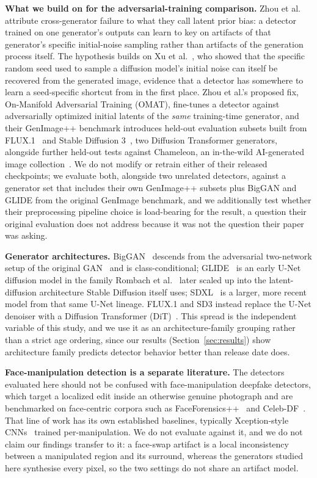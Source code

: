\documentclass[3p,times,procedia]{elsarticle}
\begin{document}
\textbf{What we build on for the adversarial-training comparison.} Zhou et
al.~\cite{zhou2025omat} attribute cross-generator failure to what they
call latent prior bias: a detector trained on one generator's outputs can
learn to key on artifacts of that generator's specific initial-noise
sampling rather than artifacts of the generation process itself. The
hypothesis builds on Xu et al.~\cite{xu2025seeds}, who showed that the
specific random seed used to sample a diffusion model's initial noise can
itself be recovered from the generated image, evidence that a detector has
somewhere to learn a seed-specific shortcut from in the first place. Zhou
et al.'s proposed fix, On-Manifold Adversarial Training (OMAT), fine-tunes
a detector against adversarially optimized initial latents of the
\emph{same} training-time generator, and their GenImage++ benchmark
introduces held-out evaluation subsets built from FLUX.1~\cite{flux2024}
and Stable Diffusion 3~\cite{esser2024sd3}, two Diffusion Transformer
generators, alongside further held-out tests against Chameleon, an
in-the-wild AI-generated image collection~\cite{yan2024chameleon}. We do
not modify or retrain either of their released checkpoints; we evaluate
both, alongside two unrelated detectors, against a generator set that
includes their own GenImage++ subsets plus BigGAN and GLIDE from the
original GenImage benchmark, and we additionally test whether their
preprocessing pipeline choice is load-bearing for the result, a question
their original evaluation does not address because it was not the
question their paper was asking.

\textbf{Generator architectures.} BigGAN~\cite{brock2019biggan} descends
from the adversarial two-network setup of the original
GAN~\cite{goodfellow2014gan} and is class-conditional; GLIDE~\cite{nichol2021glide}
is an early U-Net diffusion model in the family Rombach et
al.~\cite{rombach2022ldm} later scaled up into the latent-diffusion
architecture Stable Diffusion itself uses; SDXL~\cite{podell2023sdxl} is a
larger, more recent model from that same U-Net lineage. FLUX.1 and SD3
instead replace the U-Net denoiser with a Diffusion Transformer
(DiT)~\cite{peebles2023dit}. This spread is the independent variable of
this study, and we use it as an architecture-family grouping rather than a
strict age ordering, since our results (Section~\ref{sec:results}) show
architecture family predicts detector behavior better than release date
does.

\textbf{Face-manipulation detection is a separate literature.} The
detectors evaluated here should not be confused with face-manipulation
deepfake detectors, which target a localized edit inside an otherwise
genuine photograph and are benchmarked on face-centric corpora such as
FaceForensics++~\cite{rossler2019ff} and Celeb-DF~\cite{li2020celebdf}.
That line of work has its own established baselines, typically
Xception-style CNNs~\cite{chollet2017xception} trained per-manipulation.
We do not evaluate against it, and we do not claim our findings transfer to
it: a face-swap artifact is a local inconsistency between a manipulated
region and its surround, whereas the generators studied here synthesise
every pixel, so the two settings do not share an artifact model.
\end{document}
